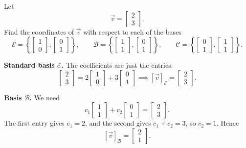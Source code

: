 \begin{example}
Let
\[
\vec{v} = \begin{bmatrix} 2 \\ 3 \end{bmatrix}.
\]
Find the coordinates of $\vec{v}$ with respect to each of the bases
\[
\mathcal{E} = \left\{ \begin{bmatrix} 1 \\ 0 \end{bmatrix}, \begin{bmatrix} 0 \\ 1 \end{bmatrix} \right\},
\qquad
\mathcal{B} = \left\{ \begin{bmatrix} 1 \\ 1 \end{bmatrix}, \begin{bmatrix} 0 \\ 1 \end{bmatrix} \right\},
\qquad
\mathcal{C} = \left\{ \begin{bmatrix} 0 \\ 1 \end{bmatrix}, \begin{bmatrix} 1 \\ 1 \end{bmatrix} \right\}.
\]

\begin{solution}
\textbf{Standard basis $\mathcal{E}$.} The coefficients are just the entries:
\[
\begin{bmatrix} 2 \\ 3 \end{bmatrix} = 2\begin{bmatrix} 1 \\ 0 \end{bmatrix} + 3\begin{bmatrix} 0 \\ 1 \end{bmatrix}
\implies
[\vec{v}]_{\mathcal{E}} = \begin{bmatrix} 2 \\ 3 \end{bmatrix}.
\]

\textbf{Basis $\mathcal{B}$.} We need
\[
c_1\begin{bmatrix} 1 \\ 1 \end{bmatrix} + c_2\begin{bmatrix} 0 \\ 1 \end{bmatrix} = \begin{bmatrix} 2 \\ 3 \end{bmatrix}.
\]
The first entry gives $c_1 = 2$, and the second gives $c_1 + c_2 = 3$, so $c_2 = 1$. Hence
\[
[\vec{v}]_{\mathcal{B}} = \begin{bmatrix} 2 \\ 1 \end{bmatrix}.
\]


\end{solution}
\end{example}
